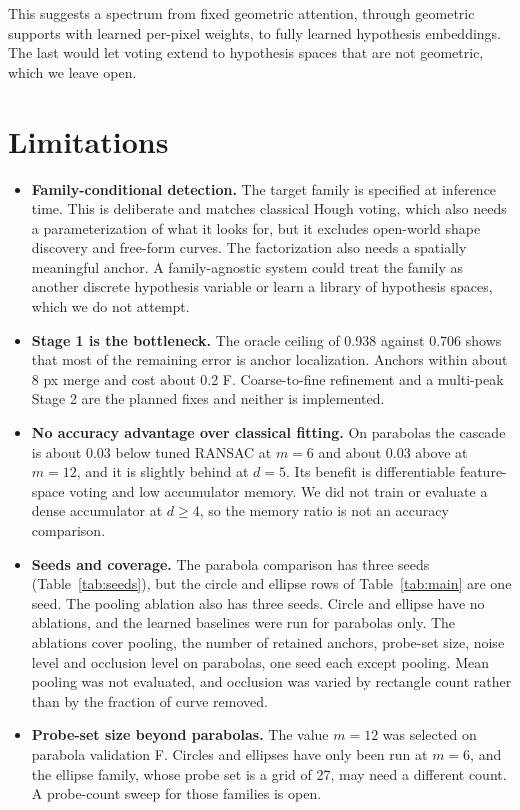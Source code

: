 \documentclass[11pt]{article}
\begin{document}
This suggests a spectrum from fixed geometric attention, through geometric supports with learned per-pixel weights, to fully learned hypothesis embeddings. The last would let voting extend to hypothesis spaces that are not geometric, which we leave open.

\FloatBarrier
\section{Limitations}
\label{sec:limitations}
\begin{itemize}
  \item \textbf{Family-conditional detection.} The target family is specified at inference time. This is deliberate and matches classical Hough voting, which also needs a parameterization of what it looks for, but it excludes open-world shape discovery and free-form curves. The factorization also needs a spatially meaningful anchor. A family-agnostic system could treat the family as another discrete hypothesis variable or learn a library of hypothesis spaces, which we do not attempt.
  \item \textbf{Stage 1 is the bottleneck.} The oracle ceiling of 0.938 against 0.706 shows that most of the remaining error is anchor localization. Anchors within about 8 px merge and cost about 0.2 F. Coarse-to-fine refinement and a multi-peak Stage 2 are the planned fixes and neither is implemented.
  \item \textbf{No accuracy advantage over classical fitting.} On parabolas the cascade is about 0.03 below tuned RANSAC at $m=6$ and about 0.03 above at $m=12$, and it is slightly behind at $d=5$. Its benefit is differentiable feature-space voting and low accumulator memory. We did not train or evaluate a dense accumulator at $d\ge4$, so the memory ratio is not an accuracy comparison.
  \item \textbf{Seeds and coverage.} The parabola comparison has three seeds (Table~\ref{tab:seeds}), but the circle and ellipse rows of Table~\ref{tab:main} are one seed. The pooling ablation also has three seeds. Circle and ellipse have no ablations, and the learned baselines were run for parabolas only. The ablations cover pooling, the number of retained anchors, probe-set size, noise level and occlusion level on parabolas, one seed each except pooling. Mean pooling was not evaluated, and occlusion was varied by rectangle count rather than by the fraction of curve removed.
  \item \textbf{Probe-set size beyond parabolas.} The value $m=12$ was selected on parabola validation F. Circles and ellipses have only been run at $m=6$, and the ellipse family, whose probe set is a grid of 27, may need a different count. A probe-count sweep for those families is open.

\end{itemize}
\end{document}
